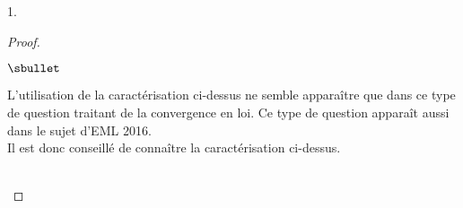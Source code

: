 \documentclass[11pt]{article}%
\begin{document}
\begin{noliste}{1.}
\begin{proof}
\begin{remark}
\begin{noliste}{$\sbullet$}
  \item L'utilisation de la caractérisation ci-dessus ne semble
    apparaître que dans ce type de question traitant de la convergence
    en loi. Ce type de question apparaît aussi dans le sujet d'EML
    2016.\\
    Il est donc conseillé de connaître la caractérisation ci-dessus.
  \end{noliste}
 \end{remark}~\\[-1.3cm]
\end{proof}
\end{noliste}
\end{document}
